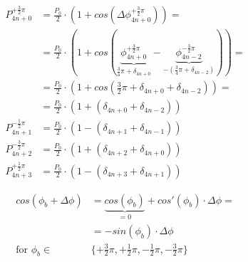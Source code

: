 \documentclass[journal,twoside,web]{ieeecolor}
\begin{document}
\begin{equation}
    \begin{split}
        P_{4n+0}^{+\frac{3}{2}\pi} & = \frac{P_0}{2} \cdot (1 + cos(\Delta\phi_{4n+0}^{+\frac{3}{2}\pi})) =                                                                                                                          \\
                                   & = \frac{P_0}{2} \cdot (1 + cos(\underbrace{\phi_{4n+0}^{+\frac{3}{2}\pi}}_{\frac{3}{4}\pi + \delta_{4n+0}} - \underbrace{\phi_{4n-2}^{-\frac{3}{2}\pi}}_{-(\frac{3}{4}\pi + \delta_{4n-2})})) = \\
                                   & = \frac{P_0}{2} \cdot (1 + cos(\frac{3}{2}\pi + \delta_{4n+0} + \delta_{4n-2})) =                                                                                                               \\
                                   & = \frac{P_0}{2} \cdot (1 + (\delta_{4n+0} + \delta_{4n-2}))                                                                                                                                     \\[10pt]
        P_{4n+1}^{-\frac{1}{2}\pi} & = \frac{P_0}{2} \cdot (1 - (\delta_{4n+1} + \delta_{4n-1}))                                                                                                                                     \\
        P_{4n+2}^{-\frac{3}{2}\pi} & = \frac{P_0}{2} \cdot (1 + (\delta_{4n+2} + \delta_{4n+0}))                                                                                                                                     \\
        P_{4n+3}^{+\frac{1}{2}\pi} & = \frac{P_0}{2} \cdot (1 - (\delta_{4n+3} + \delta_{4n+1}))
    \end{split}
    \label{eq:incident_power}
\end{equation}

\begin{equation}
    \begin{split}
        cos(\phi_{b} + \Delta\phi) & = \underbrace{cos(\phi_{b})}_{=0} + cos'(\phi_{b}) \cdot \Delta\phi =   \\
                                   & = -sin(\phi_{b}) \cdot \Delta\phi                                       \\
        \text{for } \phi_{b} \in   & \{+\frac{3}{2}\pi, +\frac{1}{2}\pi, -\frac{1}{2}\pi, -\frac{3}{2}\pi\}
    \end{split}
    \label{eq:cosine_linearization}
\end{equation}
\end{document}
